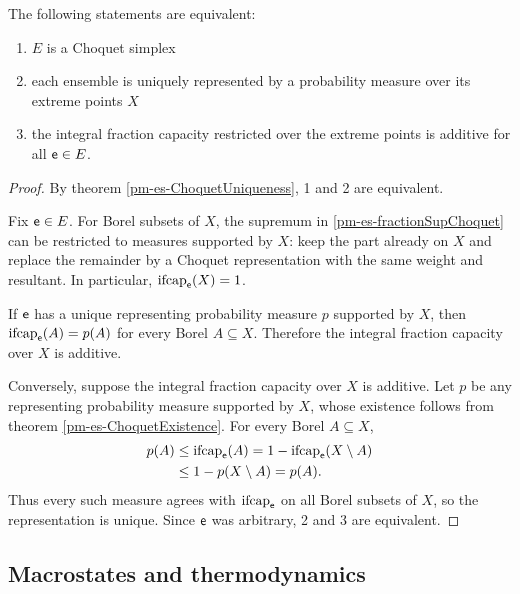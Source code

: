 \begin{mathSection}
\begin{prop}
	The following statements are equivalent:
	\begin{enumerate}
		\item $E$ is a Choquet simplex
		\item each ensemble is uniquely represented by a probability measure over its extreme points $X$
		\item the integral fraction capacity restricted over the extreme points is additive for all $\mathsf{e} \in E$.
	\end{enumerate}
\end{prop}

\begin{proof}
	By theorem \ref{pm-es-ChoquetUniqueness}, 1 and 2 are equivalent.
	
	Fix $\mathsf{e} \in E$. For Borel subsets of $X$, the supremum in \ref{pm-es-fractionSupChoquet} can be restricted to measures supported by $X$: keep the part already on $X$ and replace the remainder by a Choquet representation with the same weight and resultant. In particular, $\mathrm{ifcap}_{\mathsf{e}}(X)=1$.
	
	If $\mathsf{e}$ has a unique representing probability measure $p$ supported by $X$, then $\mathrm{ifcap}_{\mathsf{e}}(A)=p(A)$ for every Borel $A \subseteq X$. Therefore the integral fraction capacity over $X$ is additive.
	
	Conversely, suppose the integral fraction capacity over $X$ is additive. Let $p$ be any representing probability measure supported by $X$, whose existence follows from theorem \ref{pm-es-ChoquetExistence}. For every Borel $A \subseteq X$,
	\begin{equation}
		\begin{aligned}
			p(A)
			&\leq \mathrm{ifcap}_{\mathsf{e}}(A)
			= 1-\mathrm{ifcap}_{\mathsf{e}}(X\setminus A) \\
			&\leq 1-p(X\setminus A)
			= p(A).
		\end{aligned}
	\end{equation}
	Thus every such measure agrees with $\mathrm{ifcap}_{\mathsf{e}}$ on all Borel subsets of $X$, so the representation is unique. Since $\mathsf{e}$ was arbitrary, 2 and 3 are equivalent.
\end{proof}
\end{mathSection}

\subsection{Macrostates and thermodynamics}

